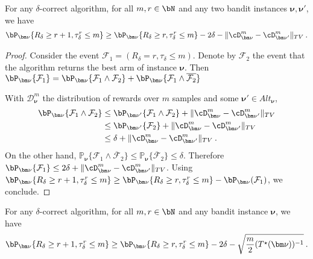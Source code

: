 \begin{lemma}\label{lem:26f_aux}
	For any $\delta$-correct algorithm, for all $m,r\in\bN$ and any two bandit instances ${\bm\nu}, {\bm\nu}'$, 
	we have
	\begin{align*}
	\bP_{\bm\nu}\{R_\delta\geq r+1,\tau_\delta^r\leq m\}
	\ge \bP_{\bm\nu}\{R_\delta\geq r,\tau_\delta^r\leq m\} - 2\delta - \Vert \cD_{\bm\nu}^m - \cD_{{\bm\nu}'}^m \Vert_{TV}
	\: .
	\end{align*}
\end{lemma}

\begin{proof}
Consider the event $\mathcal{F}_1=(R_\delta=r,\tau_\delta \leq m)$.
Denote by $\mathcal{F}_2$ the event that the algorithm returns the best arm of instance ${\bm\nu}$.
Then \(\bP_{\bm\nu}\{\mathcal{F}_1\}=\bP_{\bm\nu}\{\mathcal{F}_1\wedge \mathcal{F}_2\}+\bP_{\bm\nu}\{\mathcal{F}_1\wedge \overline{\mathcal{F}_2}\}\)
	
With $\mathcal{D}_{\bm\nu}^m$ the distribution of rewards over $m$ samples and some ${\bm\nu}'\in Alt_{\bm\nu}$,
\begin{align*}
\bP_{\bm\nu}\{\mathcal{F}_1\wedge \mathcal{F}_2\}
&\leq \bP_{{\bm\nu}'}\{\mathcal{F}_1\wedge \mathcal{F}_2\}+\Vert\cD_{\bm\nu}^m -\cD_{{\bm\nu}'}^m\Vert_{TV}
\\
&\leq \bP_{{\bm\nu}'}\{\mathcal{F}_2\} +\Vert\cD_{\bm\nu}^m -\cD_{{\bm\nu}'}^m\Vert_{TV}
\\
&\leq \delta+\Vert\cD_{\bm\nu}^m -\cD_{{\bm\nu}'}^m\Vert_{TV}
\: .
\end{align*}
On the other hand, $\mathbb{P}_{\bm\nu}\{\mathcal F_1 \wedge \overline{\mathcal F}_2\} \le \mathbb{P}_{\bm\nu}\{\overline{\mathcal F}_2\} \le \delta$.
Therefore $\bP_{\bm\nu}\{\mathcal{F}_1\}\leq 2\delta + \Vert\cD_{\bm\nu}^m -\cD_{{\bm\nu}'}^m\Vert_{TV}$.
Using \( \bP_{\bm\nu}\{R_\delta\geq r+1,\tau_\delta^r\leq m\}\geq \bP_{\bm\nu}\{R_\delta\geq r,\tau_\delta^r\leq m\}-\bP_{\bm\nu}(\mathcal{F}_1)\), we conclude.
\end{proof}


\begin{lemma}\label{lem:26f}
	For any $\delta$-correct algorithm, for all $m,r\in\bN$ and any bandit instance ${\bm\nu}$, 
	we have
	\begin{align*}
	\bP_{\bm\nu}\{R_\delta\geq r+1,\tau_\delta^r\leq m\}
	\ge \bP_{\bm\nu}\{R_\delta\geq r,\tau_\delta^r\leq m\} - 2\delta - \sqrt{\frac{m}{2} (T^\star(\bm\nu))^{-1}}
	\: .
	\end{align*}
\end{lemma}



